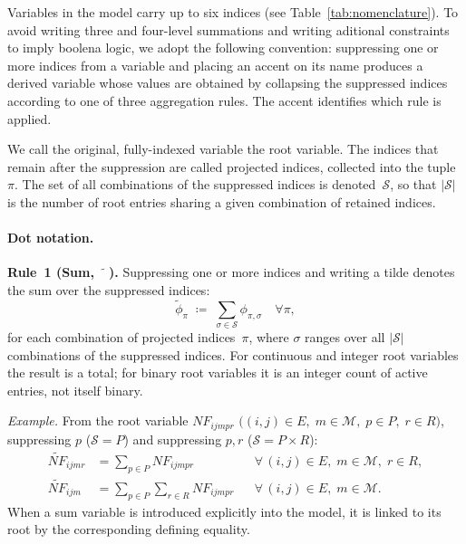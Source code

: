 
\begin{convention}
\label{conv:notation}

Variables in the model carry up to six indices (see
Table~\ref{tab:nomenclature}). To avoid writing three and four-level
summations and writing aditional constraints to imply boolena logic, we adopt the following convention: suppressing
one or more indices from a variable and placing an accent on its name
produces a derived variable whose values are obtained by
collapsing the suppressed indices according to one of three aggregation
rules. The accent identifies which rule is applied.

We call the original, fully-indexed variable the root variable.
The indices that remain after the suppression are called projected
indices, collected into the tuple~$\pi$. The set of all combinations of the suppressed indices is
denoted~$\mathcal{S}$, so that $|\mathcal{S}|$ is the number of root
entries sharing a given combination of retained indices.



\paragraph{Dot notation.}

\medskip
\noindent\textbf{Rule~1 \textnormal{(Sum,~$\widetilde{\phantom{x}}$).}}
Suppressing one or more indices and writing a tilde denotes the
sum over the suppressed indices:
\[
  \widetilde{\phi}_{\pi}
  \;\coloneqq\;
  \sum_{\sigma\in\mathcal{S}} \phi_{\pi,\sigma} \quad \forall \pi,
\]
for each combination of projected indices~$\pi$, where $\sigma$ ranges
over all $|\mathcal{S}|$ combinations of the suppressed indices. For
continuous and integer root variables the result is a total; for binary
root variables it is an integer count of active entries, not itself
binary.

\smallskip\noindent\textit{Example.}
From the root variable $NF_{ijmpr}$
$\bigl((i,j)\!\in\!E,\;m\!\in\!\mathcal{M},\;p\!\in\!P,
  \;r\!\in\!R\bigr)$, suppressing $p$
($\mathcal{S}=P$) and suppressing $p,r$
($\mathcal{S}=P\times R$):
\begin{align}
  \widetilde{NF}_{ijmr}
  &= \sum_{p\in P} NF_{ijmpr}
  && \forall\,(i,j)\in E,\;m\in\mathcal{M},\;r\in R,
  \label{eq:sum-ex1} \\[4pt]
  \widetilde{NF}_{ijm}
  &= \sum_{p\in P}\sum_{r\in R} NF_{ijmpr}
  && \forall\,(i,j)\in E,\;m\in\mathcal{M}.
  \label{eq:sum-ex2}
\end{align}
When a sum variable is introduced explicitly into the model, it is
linked to its root by the corresponding defining equality.


\end{convention}
